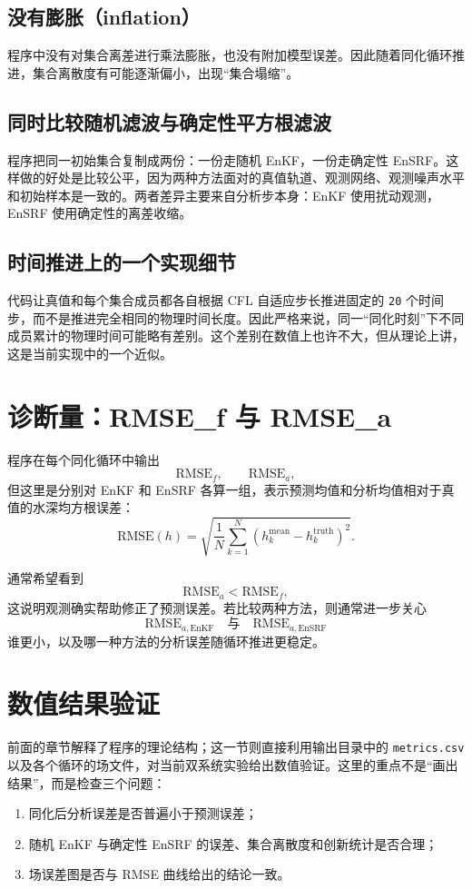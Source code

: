 \documentclass[12pt,a4paper]{article}
\begin{document}
\subsection{没有膨胀（inflation）}

程序中没有对集合离差进行乘法膨胀，也没有附加模型误差。因此随着同化循环推进，集合离散度有可能逐渐偏小，出现“集合塌缩”。

\subsection{同时比较随机滤波与确定性平方根滤波}

程序把同一初始集合复制成两份：一份走随机 EnKF，一份走确定性 EnSRF。这样做的好处是比较公平，因为两种方法面对的真值轨道、观测网络、观测噪声水平和初始样本是一致的。两者差异主要来自分析步本身：EnKF 使用扰动观测，EnSRF 使用确定性的离差收缩。

\subsection{时间推进上的一个实现细节}

代码让真值和每个集合成员都各自根据 CFL 自适应步长推进固定的 \texttt{20} 个时间步，而不是推进完全相同的物理时间长度。因此严格来说，同一“同化时刻”下不同成员累计的物理时间可能略有差别。这个差别在数值上也许不大，但从理论上讲，这是当前实现中的一个近似。

\section{诊断量：RMSE\_f 与 RMSE\_a}

程序在每个同化循环中输出
\[
\mathrm{RMSE}_f, \qquad \mathrm{RMSE}_a,
\]
但这里是分别对 EnKF 和 EnSRF 各算一组，表示预测均值和分析均值相对于真值的水深均方根误差：
\[
\mathrm{RMSE}(h)
= \sqrt{
\frac{1}{N}
\sum_{k=1}^{N}\left(h_k^{\mathrm{mean}}-h_k^{\mathrm{truth}}\right)^2
}.
\]

通常希望看到
\[
\mathrm{RMSE}_a < \mathrm{RMSE}_f,
\]
这说明观测确实帮助修正了预测误差。若比较两种方法，则通常进一步关心
\[
\mathrm{RMSE}_{a,\mathrm{EnKF}}
\quad\text{与}\quad
\mathrm{RMSE}_{a,\mathrm{EnSRF}}
\]
谁更小，以及哪一种方法的分析误差随循环推进更稳定。

\section{数值结果验证}

前面的章节解释了程序的理论结构；这一节则直接利用输出目录中的
\texttt{metrics.csv} 以及各个循环的场文件，对当前双系统实验给出数值验证。这里的重点不是“画出结果”，而是检查三个问题：
\begin{enumerate}
    \item 同化后分析误差是否普遍小于预测误差；
    \item 随机 EnKF 与确定性 EnSRF 的误差、集合离散度和创新统计是否合理；
    \item 场误差图是否与 RMSE 曲线给出的结论一致。
\end{enumerate}
\end{document}
